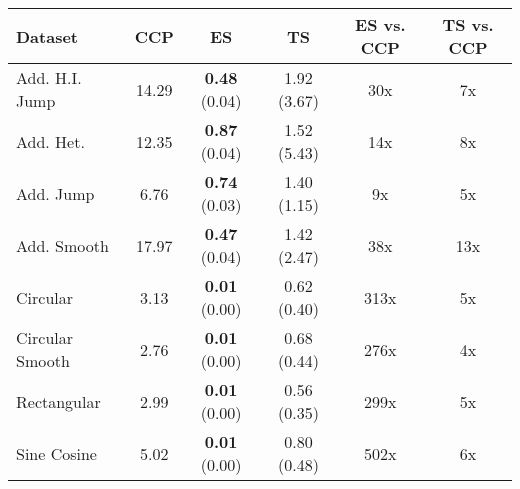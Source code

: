 \begin{tabular}{lccccc}
\toprule
Dataset & CCP & ES & TS & ES vs. CCP & TS vs. CCP \\
\midrule
Add. H.I. Jump & 14.29 & \textbf{0.48} (0.04) & 1.92 (3.67) & 30x & 7x \\
Add. Het. & 12.35 & \textbf{0.87} (0.04) & 1.52 (5.43) & 14x & 8x \\
Add. Jump & 6.76 & \textbf{0.74} (0.03) & 1.40 (1.15) & 9x & 5x \\
Add. Smooth & 17.97 & \textbf{0.47} (0.04) & 1.42 (2.47) & 38x & 13x \\
Circular & 3.13 & \textbf{0.01} (0.00) & 0.62 (0.40) & 313x & 5x \\
Circular Smooth & 2.76 & \textbf{0.01} (0.00) & 0.68 (0.44) & 276x & 4x \\
Rectangular & 2.99 & \textbf{0.01} (0.00) & 0.56 (0.35) & 299x & 5x \\
Sine Cosine & 5.02 & \textbf{0.01} (0.00) & 0.80 (0.48) & 502x & 6x \\
\bottomrule
\end{tabular}